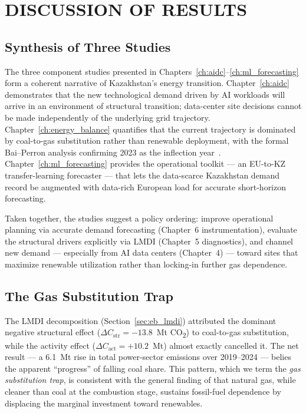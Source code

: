 
\chapter{DISCUSSION OF RESULTS}
\label{ch:discussion}

\section{Synthesis of Three Studies}
\label{sec:disc_synthesis}

The three component studies presented in Chapters~\ref{ch:aidc}--\ref{ch:ml_forecasting} form a coherent narrative of Kazakhstan's energy transition. Chapter~\ref{ch:aidc} demonstrates that the new technological demand driven by AI workloads will arrive in an environment of structural transition; data-center site decisions cannot be made independently of the underlying grid trajectory. Chapter~\ref{ch:energy_balance} quantifies that the current trajectory is dominated by coal-to-gas substitution rather than renewable deployment, with the formal Bai--Perron analysis confirming 2023 as the inflection year~\cite{baiperron2003}. Chapter~\ref{ch:ml_forecasting} provides the operational toolkit --- an EU-to-KZ transfer-learning forecaster --- that lets the data-scarce Kazakhstan demand record be augmented with data-rich European load for accurate short-horizon forecasting.

Taken together, the studies suggest a policy ordering: improve operational planning via accurate demand forecasting (Chapter~6 instrumentation), evaluate the structural drivers explicitly via LMDI (Chapter~5 diagnostics), and channel new demand --- especially from AI data centers (Chapter~4) --- toward sites that maximize renewable utilization rather than locking-in further gas dependence.

\section{The Gas Substitution Trap}
\label{sec:disc_gas_trap}

The LMDI decomposition (Section~\ref{sec:eb_lmdi}) attributed the dominant negative structural effect ($\Delta C_{\text{str}} = -13.8$~Mt CO\textsubscript{2}) to coal-to-gas substitution, while the activity effect ($\Delta C_{\text{act}} = +10.2$~Mt) almost exactly cancelled it. The net result --- a 6.1~Mt rise in total power-sector emissions over 2019--2024 --- belies the apparent ``progress'' of falling coal share. This pattern, which we term the \emph{gas substitution trap}, is consistent with the general finding of \cite{griffiths2021} that natural gas, while cleaner than coal at the combustion stage, sustains fossil-fuel dependence by displacing the marginal investment toward renewables.

